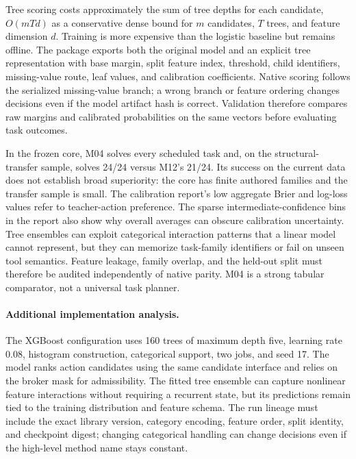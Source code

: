 Tree scoring costs approximately the sum of tree depths for each candidate, $O(mTd)$ as a conservative dense bound for $m$ candidates, $T$ trees, and feature dimension $d$. Training is more expensive than the logistic baseline but remains offline. The package exports both the original model and an explicit tree representation with base margin, split feature index, threshold, child identifiers, missing-value route, leaf values, and calibration coefficients. Native scoring follows the serialized missing-value branch; a wrong branch or feature ordering changes decisions even if the model artifact hash is correct. Validation therefore compares raw margins and calibrated probabilities on the same vectors before evaluating task outcomes.

In the frozen core, M04 solves every scheduled task and, on the structural-transfer sample, solves 24/24 versus M12's 21/24. Its success on the current data does not establish broad superiority: the core has finite authored families and the transfer sample is small. The calibration report's low aggregate Brier and log-loss values refer to teacher-action preference. The sparse intermediate-confidence bins in the report also show why overall averages can obscure calibration uncertainty. Tree ensembles can exploit categorical interaction patterns that a linear model cannot represent, but they can memorize task-family identifiers or fail on unseen tool semantics. Feature leakage, family overlap, and the held-out split must therefore be audited independently of native parity. M04 is a strong tabular comparator, not a universal task planner.



\paragraph{Additional implementation analysis.} The XGBoost configuration uses 160 trees of maximum depth five, learning rate 0.08, histogram construction, categorical support, two jobs, and seed 17. The model ranks action candidates using the same candidate interface and relies on the broker mask for admissibility. The fitted tree ensemble can capture nonlinear feature interactions without requiring a recurrent state, but its predictions remain tied to the training distribution and feature schema. The run lineage must include the exact library version, category encoding, feature order, split identity, and checkpoint digest; changing categorical handling can change decisions even if the high-level method name stays constant.

